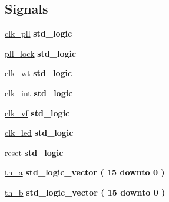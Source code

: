 \subsection*{Signals}
 \begin{DoxyCompactItemize}
\item 
\hyperlink{class_d_e0___n_a_n_o___v_f_1_1_m_a_i_n_a1d63ebfc050c1099e1dff991817ec3b0}{clk\+\_\+pll} {\bfseries \textcolor{comment}{std\+\_\+logic}\textcolor{vhdlchar}{ }} 
\item 
\hyperlink{class_d_e0___n_a_n_o___v_f_1_1_m_a_i_n_ac43fa0336d7f5cd9ac8e0c6994b9f4df}{pll\+\_\+lock} {\bfseries \textcolor{comment}{std\+\_\+logic}\textcolor{vhdlchar}{ }} 
\item 
\hyperlink{class_d_e0___n_a_n_o___v_f_1_1_m_a_i_n_ab7d66bf3e68700b49fb015413b3e0942}{clk\+\_\+wt} {\bfseries \textcolor{comment}{std\+\_\+logic}\textcolor{vhdlchar}{ }} 
\item 
\hyperlink{class_d_e0___n_a_n_o___v_f_1_1_m_a_i_n_ad9e2ede9bec32660c6cd9d7b31c12b02}{clk\+\_\+int} {\bfseries \textcolor{comment}{std\+\_\+logic}\textcolor{vhdlchar}{ }} 
\item 
\hyperlink{class_d_e0___n_a_n_o___v_f_1_1_m_a_i_n_ac8f65478566c027830639b880f06cdc8}{clk\+\_\+vf} {\bfseries \textcolor{comment}{std\+\_\+logic}\textcolor{vhdlchar}{ }} 
\item 
\hyperlink{class_d_e0___n_a_n_o___v_f_1_1_m_a_i_n_a710fb553e23a16a0e0064507901568ca}{clk\+\_\+led} {\bfseries \textcolor{comment}{std\+\_\+logic}\textcolor{vhdlchar}{ }} 
\item 
\hyperlink{class_d_e0___n_a_n_o___v_f_1_1_m_a_i_n_aba73547f4eb746eaf78a2fc2684191e3}{reset} {\bfseries \textcolor{comment}{std\+\_\+logic}\textcolor{vhdlchar}{ }} 
\item 
\hyperlink{class_d_e0___n_a_n_o___v_f_1_1_m_a_i_n_a624a974c2a222ff8e7bee76fbf24f5ae}{th\+\_\+a} {\bfseries \textcolor{comment}{std\+\_\+logic\+\_\+vector}\textcolor{vhdlchar}{ }\textcolor{vhdlchar}{(}\textcolor{vhdlchar}{ }\textcolor{vhdlchar}{ } \textcolor{vhdldigit}{15} \textcolor{vhdlchar}{ }\textcolor{keywordflow}{downto}\textcolor{vhdlchar}{ }\textcolor{vhdlchar}{ } \textcolor{vhdldigit}{0} \textcolor{vhdlchar}{ }\textcolor{vhdlchar}{)}\textcolor{vhdlchar}{ }} 
\item 
\hyperlink{class_d_e0___n_a_n_o___v_f_1_1_m_a_i_n_a5ce947e047b8551e6cc853affa472cdf}{th\+\_\+b} {\bfseries \textcolor{comment}{std\+\_\+logic\+\_\+vector}\textcolor{vhdlchar}{ }\textcolor{vhdlchar}{(}\textcolor{vhdlchar}{ }\textcolor{vhdlchar}{ } \textcolor{vhdldigit}{15} \textcolor{vhdlchar}{ }\textcolor{keywordflow}{downto}\textcolor{vhdlchar}{ }\textcolor{vhdlchar}{ } \textcolor{vhdldigit}{0} \textcolor{vhdlchar}{ }\textcolor{vhdlchar}{)}\textcolor{vhdlchar}{ }} 

\end{DoxyCompactItemize}
